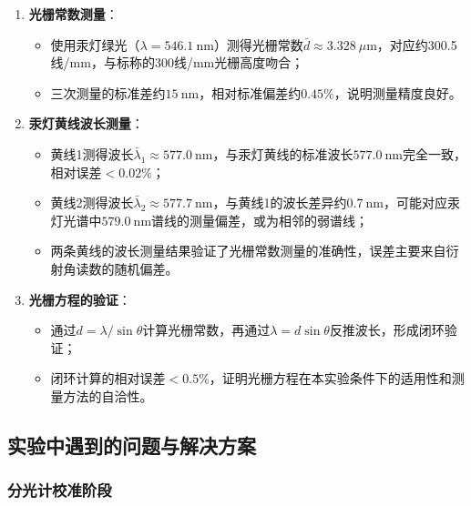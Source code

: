 \documentclass[11pt]{article}
\begin{document}
\begin{enumerate}
    \item \textbf{光栅常数测量}：
    \begin{itemize}
        \item 使用汞灯绿光（$\lambda = 546.1\ \text{nm}$）测得光栅常数$\bar{d} \approx 3.328\ \mu\text{m}$，对应约300.5线/mm，与标称的300线/mm光栅高度吻合；
        \item 三次测量的标准差约$15\ \text{nm}$，相对标准偏差约$0.45\%$，说明测量精度良好。
    \end{itemize}
    
    \item \textbf{汞灯黄线波长测量}：
    \begin{itemize}
        \item 黄线1测得波长$\bar{\lambda}_1 \approx 577.0\ \text{nm}$，与汞灯黄线的标准波长$577.0\ \text{nm}$完全一致，相对误差$< 0.02\%$；
        \item 黄线2测得波长$\bar{\lambda}_2 \approx 577.7\ \text{nm}$，与黄线1的波长差异约$0.7\ \text{nm}$，可能对应汞灯光谱中$579.0\ \text{nm}$谱线的测量偏差，或为相邻的弱谱线；
        \item 两条黄线的波长测量结果验证了光栅常数测量的准确性，误差主要来自衍射角读数的随机偏差。
    \end{itemize}
    
    \item \textbf{光栅方程的验证}：
    \begin{itemize}
        \item 通过$d = \lambda / \sin\theta$计算光栅常数，再通过$\lambda = d\sin\theta$反推波长，形成闭环验证；
        \item 闭环计算的相对误差$< 0.5\%$，证明光栅方程在本实验条件下的适用性和测量方法的自洽性。
    \end{itemize}
\end{enumerate}

\subsection{实验中遇到的问题与解决方案}

\subsubsection{分光计校准阶段}
\end{document}
